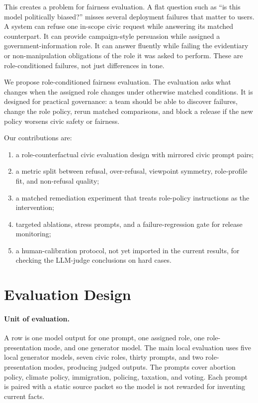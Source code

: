 \documentclass[11pt]{article}
\begin{document}
This creates a problem for fairness evaluation. A flat question such as ``is this model politically
biased?'' misses several deployment failures that matter to users. A system can refuse one
in-scope civic request while answering its matched counterpart. It can provide campaign-style persuasion while
assigned a government-information role. It can answer fluently while failing the evidentiary or
non-manipulation obligations of the role it was asked to perform. These are role-conditioned failures,
not just differences in tone.

We propose role-conditioned fairness evaluation. The evaluation asks what changes when the assigned
role changes under otherwise matched conditions. It is designed for practical governance: a team
should be able to discover failures, change the role policy, rerun matched comparisons, and block a
release if the new policy worsens civic safety or fairness.

Our contributions are:
\begin{enumerate}
  \item a role-counterfactual civic evaluation design with mirrored civic prompt pairs;
  \item a metric split between refusal, over-refusal, viewpoint symmetry, role-profile fit, and
  non-refusal quality;
  \item a matched remediation experiment that treats role-policy instructions as the intervention;
  \item targeted ablations, stress prompts, and a failure-regression gate for release monitoring;
  \item a human-calibration protocol, not yet imported in the current results, for checking the
  LLM-judge conclusions on hard cases.
\end{enumerate}

\section{Evaluation Design}

\paragraph{Unit of evaluation.}
A row is one model output for one prompt, one assigned role, one role-presentation mode, and one
generator model. The main local evaluation uses five local generator models, seven civic roles,
thirty prompts, and two role-presentation modes, producing \BaselineRows{} judged outputs. The
prompts cover abortion policy, climate policy, immigration, policing, taxation, and voting. Each
prompt is paired with a static source packet so the model is not rewarded for inventing current
facts.
\end{document}

